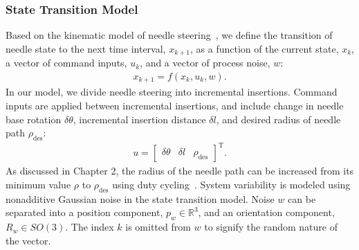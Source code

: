 \subsubsection{State Transition Model}
Based on the kinematic model of needle steering~\cite{Webster2006}, we define the transition of needle state to the next time interval, ${x_{k+1}}$, as a function of the current state, ${x_{k}}$, a vector of command inputs, ${u_{k}}$, and a vector of process noise, ${w}$:
\begin{align}
{x_{k+1}} = f({x_k}, {u_k}, {w}).
\end{align}
In our model, we divide needle steering into incremental insertions. Command inputs are applied between incremental insertions, and include change in needle base rotation $\delta\theta$, incremental insertion distance $\delta l$, and desired radius of needle path $\rho_\text{des}$:
\begin{align}
{u} = \begin{bmatrix} \delta\theta & \delta l & \rho_\text{des}\end{bmatrix}^{\text{T}}.
\end{align}
As discussed in Chapter 2, the radius of the needle path can be increased from its minimum value $\rho$ to $\rho_\text{des}$ using duty cycling~\cite{Minhas2007}. System variability is modeled using nonadditive Gaussian noise in the state transition model. Noise ${w}$ can be separated into a position component, ${p_w} \in \mathbb{R}^3$, and an orientation component, ${R_w} \in SO(3)$. The index $k$ is omitted from ${w}$ to signify the random nature of the vector.

